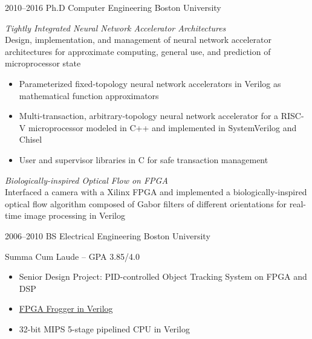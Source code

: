 \documentclass[]{friggeri-cv} %
\begin{document}
\begin{entrylist}


\entry
{2010--2016}
{Ph.D {\normalfont Computer Engineering}}
{Boston University}
{\emph{Tightly Integrated Neural Network Accelerator Architectures} \\
  Design, implementation, and management of neural network accelerator architectures for approximate computing, general use, and prediction of microprocessor state
  \begin{itemize}
  \item Parameterized fixed-topology neural network accelerators in Verilog as mathematical function approximators
  \item Multi-transaction, arbitrary-topology neural network accelerator for a RISC-V microprocessor modeled in C++ and implemented in SystemVerilog and Chisel
  \item User and supervisor libraries in C for safe transaction management
  \end{itemize}
  \emph{Biologically-inspired Optical Flow on FPGA} \\
  Interfaced a camera with a Xilinx FPGA and implemented a biologically-inspired optical flow algorithm composed of Gabor filters of different orientations for real-time image processing in Verilog
}


\entry
{2006--2010}
{BS {\normalfont Electrical Engineering}}
{Boston University}
{Summa Cum Laude -- GPA 3.85/4.0
  \begin{itemize}
  \item Senior Design Project: PID-controlled Object Tracking System on FPGA and DSP
  \item \href{https://www.youtube.com/watch?v=S2LgUL5JLqQ}{FPGA Frogger in Verilog}
  \item 32-bit MIPS 5-stage pipelined CPU in Verilog
  \end{itemize}
}


\end{entrylist}

\end{document}
